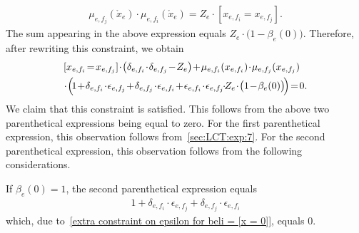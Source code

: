 \documentclass[journal]{IEEEtran}
\newcommand{\add}[1]{{\color{black}#1}}
\newcommand{\beli}{\beta}
\newcommand{\LCT}[1]{ \mathring{#1} }
\newcommand{\efi}{ e,f_i }
\newcommand{\efj}{ e,f_j }
\begin{document}
\begin{appendices}
\begin{enumerate}
\begin{align*}
            \mu_{\efj}(\LCT{x}_e)
            \cdot
            \mu_{\efi}(\LCT{x}_e)
            = Z_e
            \cdot
            [x_{\efi} \!=\! x_{\efj}].
          \end{align*}
          The sum appearing in the above expression equals
          $Z_e \cdot \bigl( 1 - \beli_e(0) \bigr)$. Therefore, after rewriting this
          \add{constraint, we obtain}
          \begin{align*}
             &
            [x_{\efi} \!=\! x_{\efj}]
            \!\cdot\!
            \bigl(
            \delta_{\efi}
            \!\cdot\!
            \delta_{\efj}
            \!-\!
            Z_e
            \bigr)
            \!+\!
            \mu_{\efi}(x_{\efi})
            \!\cdot\!
            \mu_{\efj}(x_{\efj}) \\
             & \!\cdot\!\Bigl(\!
            1
            \!+\!
            \delta_{\efi}
            \!\cdot\!
            \epsilon_{\efj}
            \!+\!
            \delta_{\efj}
            \!\cdot\!
            \epsilon_{\efi}
            \!+\!
            \epsilon_{\efi}
            \!\cdot\!
            \epsilon_{\efj}
            \!\!\cdot\!\!
            Z_e
            \!\cdot\!
            \bigl( 1 \!-\! \beli_e(0) \bigr)
            \!\Bigr)
            \!=\! 0.
          \end{align*}
          We claim that this constraint is satisfied.
          This follows from the above two parenthetical
          expressions being equal to zero. For the first parenthetical
          expression, this observation follows
          from~\eqref{sec:LCT:exp:7}. For the second parenthetical
          expression, this observation follows from the following
          considerations.

          If $ \beli_e(0) = 1$, the second parenthetical expression equals
          \begin{align*}
            1
            +
            \delta_{\efi}
            \cdot
            \epsilon_{\efj}
            +
            \delta_{\efj}
            \cdot
            \epsilon_{\efi}
          \end{align*}
          which, due to~\eqref{extra constraint on epsilon for beli =
              [x = 0]}, equals $0$.


\end{enumerate}
\end{appendices}
\end{document}
